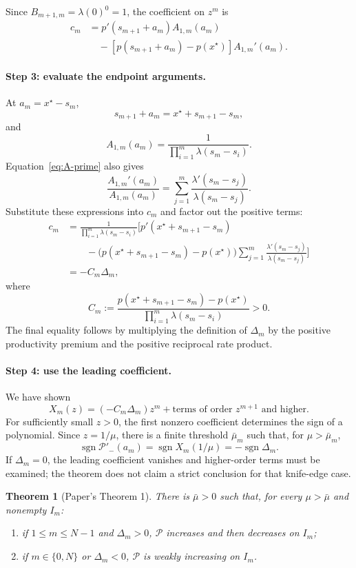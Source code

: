 \documentclass[11pt]{article}
\theoremstyle{tutorial}
\newtheorem{theorem}{Theorem}[section]
\theoremstyle{remark}
\newcommand{\1}{\mathbb{I}}
\newcommand{\calP}{\mathcal{P}}
\begin{document}
Since $B_{m+1,m}=\lambda(0)^0=1$, the coefficient on $z^m$ is
\begin{align*}
c_m
&=p'(s_{m+1}+a_m)A_{1,m}(a_m)\\
&\quad-[p(s_{m+1}+a_m)-p(x^\star)]A_{1,m}'(a_m).
\end{align*}

\paragraph{Step 3: evaluate the endpoint arguments.}
At $a_m=x^\star-s_m$,
\[
s_{m+1}+a_m=x^\star+s_{m+1}-s_m,
\]
and
\[
A_{1,m}(a_m)
=\frac{1}{\prod_{i=1}^m\lambda(s_m-s_i)}.
\]
Equation~\eqref{eq:A-prime} also gives
\[
\frac{A_{1,m}'(a_m)}{A_{1,m}(a_m)}
=\sum_{j=1}^m\frac{\lambda'(s_m-s_j)}{\lambda(s_m-s_j)}.
\]
Substitute these expressions into $c_m$ and factor out the positive terms:
\begin{align*}
c_m
&=\frac{1}{\prod_{i=1}^m\lambda(s_m-s_i)}
\Bigg[p'(x^\star+s_{m+1}-s_m)\\
&\qquad-\bigl(p(x^\star+s_{m+1}-s_m)-p(x^\star)\bigr)
\sum_{j=1}^m\frac{\lambda'(s_m-s_j)}{\lambda(s_m-s_j)}\Bigg]\\
&=-C_m\Delta_m,
\end{align*}
where
\[
C_m:=\frac{p(x^\star+s_{m+1}-s_m)-p(x^\star)}
{\prod_{i=1}^m\lambda(s_m-s_i)}>0.
\]
The final equality follows by multiplying the definition of $\Delta_m$ by the positive productivity
premium and the positive reciprocal rate product.

\paragraph{Step 4: use the leading coefficient.}
We have shown
\[
  X_m(z)=(-C_m\Delta_m)z^m+\text{terms of order }z^{m+1}\text{ and higher}.
\]
For sufficiently small $z>0$, the first nonzero coefficient determines the sign of a polynomial.  Since
$z=1/\mu$, there is a finite threshold $\bar\mu_m$ such that, for $\mu>\bar\mu_m$,
\[
\operatorname{sgn}\calP'_{-}(a_m)
=\operatorname{sgn}X_m(1/\mu)
=-\operatorname{sgn}\Delta_m.
\]
If $\Delta_m=0$, the leading coefficient vanishes and higher-order terms must be examined; the theorem does
not claim a strict conclusion for that knife-edge case.

\begin{theorem}[Paper's Theorem 1]
There is $\bar\mu>0$ such that, for every $\mu>\bar\mu$ and nonempty $I_m$:
\begin{enumerate}
  \item if $1\le m\le N-1$ and $\Delta_m>0$, $\calP$ increases and then decreases on $I_m$;
  \item if $m\in\{0,N\}$ or $\Delta_m<0$, $\calP$ is weakly increasing on $I_m$.
\end{enumerate}
\end{theorem}
\end{document}
